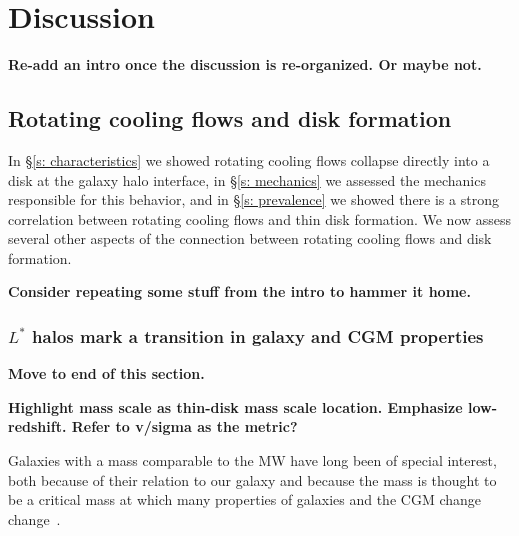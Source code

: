 \documentclass[fleqn,usenatbib]{mnras}
\begin{document}
\section{Discussion}
\label{s: discussion}

\textbf{Re-add an intro once the discussion is re-organized. Or maybe not.}

\subsection{Rotating cooling flows and disk formation}
\label{s: disk formation}

In \S\ref{s: characteristics} we showed rotating cooling flows collapse directly into a disk at the galaxy halo interface, in \S\ref{s: mechanics} we assessed the mechanics responsible for this behavior, and in \S\ref{s: prevalence} we showed there is a strong correlation between rotating cooling flows and thin disk formation.
We now assess several other aspects of the connection between rotating cooling flows and disk formation.


\textbf{
Consider repeating some stuff from the intro to hammer it home.
}

\subsubsection{$L^*$ halos mark a transition in galaxy and CGM properties}
\label{s: disk formation -- transition}

\textbf{
Move to end of this section.
}

\textbf{
Highlight mass scale as thin-disk mass scale location.
Emphasize low-redshift.
Refer to v/sigma as the metric?
}

Galaxies with a mass comparable to the MW have long been of special interest, both because of their relation to our galaxy and because the mass is thought to be a critical mass at which many properties of galaxies and the CGM change change~\citep[e.g.][]{Fielding2017, Correa2017, Dekel2019a}.
\end{document}
